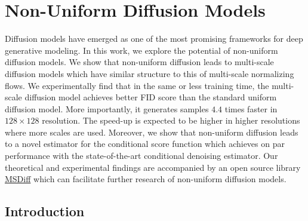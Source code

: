 
\chapter{Non-Uniform Diffusion Models}

\ifpdf
    \graphicspath{{Chapter2/Figs/Raster/}{Chapter2/Figs/PDF/}{Chapter2/Figs/}}
\else
    \graphicspath{{Chapter2/Figs/Vector/}{Chapter2/Figs/}}
\fi


Diffusion models have emerged as one of the most promising frameworks for deep generative modeling. In this work, we explore the potential of non-uniform diffusion models. We show that non-uniform diffusion leads to multi-scale diffusion models which have similar structure to this of multi-scale normalizing flows. We experimentally find that in the same or less training time, the multi-scale diffusion model achieves better FID score than the standard uniform diffusion model. More importantly, it generates samples $4.4$ times faster in $128\times 128$ resolution. The speed-up is expected to be higher in higher resolutions where more scales are used. Moreover, we show that non-uniform diffusion leads to a novel estimator for the conditional score function which achieves on par performance with the state-of-the-art conditional denoising estimator. Our theoretical and experimental findings are accompanied by an open source library \href{https://github.com/GBATZOLIS/MSDiff}{MSDiff}
which can facilitate further research of non-uniform diffusion models.

\section{Introduction}

